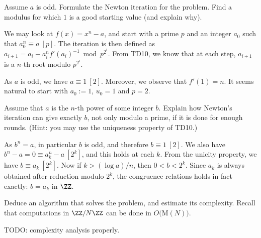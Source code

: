 \documentclass[11pt]{exam}
\theoremstyle{definition}
\begin{document}
\begin{questions}

  \question Assume $a$ is odd. Formulate the Newton iteration for the problem. Find a modulus for which $1$ is a good starting value (and explain why).

  \begin{solution}
    We may look at $f(x)=x^n-a$, and start with a prime $p$ and an integer $a_0$ such that $a_0^n\equiv a~[p]$. The iteration is then defined as $a_{i+1}=a_i-a_i^nf'(a_i)^{-1} \bmod p^{2^i}$. From TD10, we know that at each step, $a_{i+1}$ is a $n$-th root modulo $p^{2^i}$.

    As $a$ is odd, we have $a\equiv 1~[2]$.  Moreover, we observe that $f'(1)=n$. It seems natural to start with $a_0:=1$, $u_0=1$ and $p=2$.
    
  \end{solution}

  \question Assume that $a$ is the $n$-th power of some integer $b$. Explain how Newton's iteration can give exactly $b$, not only modulo a prime, if it is done for enough rounds. (Hint: you may use the uniqueness property of TD10.)

  \begin{solution}
    As $b^n = a$, in particular $b$ is odd, and therefore $b\equiv 1~[2]$. We also have $b^n-a = 0 \equiv a_{k}^n -a ~[2^{k}]$, and this holds at each $k$. From the unicity property, we have $b \equiv a_k~[2^k]$. Now if $k>(\log a)/n$, then $0<b<2^k$. Since $a_k$ is always obtained after reduction modulo $2^k$, the congruence relations holds in fact exactly: $b=a_k$ in $\ZZ$.   
  \end{solution}

  \question  Deduce an algorithm that solves the problem, and estimate its complexity. Recall that computations in $\ZZ/N\ZZ$ can be done in $O(${\sc M}$(N))$.

  \begin{solution}
    TODO: complexity analysis properly.
    \end{solution}


\end{questions}
\end{document}
